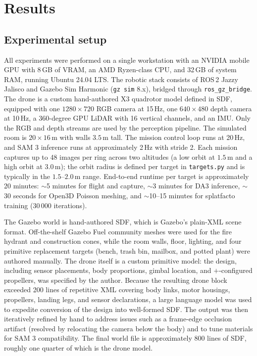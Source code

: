 \documentclass[conference]{IEEEtran}
\begin{document}
\section{Results}
\label{sec:results}

\subsection{Experimental setup}

All experiments were performed on a single workstation with an
NVIDIA mobile GPU with 8\,GB of VRAM, an AMD Ryzen-class CPU, and
32\,GB of system RAM, running Ubuntu 24.04 LTS. The robotic stack
consists of ROS\,2 Jazzy Jalisco and Gazebo Sim Harmonic
(\texttt{gz sim} 8.x), bridged through \texttt{ros\_gz\_bridge}.
The drone is a custom hand-authored X3 quadrotor model defined in
SDF, equipped with one $1280\!\times\!720$ RGB camera at 15\,Hz,
one $640\!\times\!480$ depth camera at 10\,Hz, a 360-degree GPU
LiDAR with 16 vertical channels, and an IMU. Only the RGB and depth
streams are used by the perception pipeline. The simulated room is
$20\!\times\!16$\,m with walls $3.5$\,m tall. The mission control
loop runs at 20\,Hz, and SAM 3 inference runs at approximately
2\,Hz with stride 2. Each mission captures up to 48 images per
ring across two altitudes (a low orbit at $1.5$\,m and a high
orbit at $3.0$\,m); the orbit radius is defined per target in
\texttt{targets.py} and is typically in the $1.5$--$2.0$\,m range.
End-to-end runtime per target is approximately 20 minutes:
$\sim$5 minutes for flight and capture, $\sim$3 minutes for DA3
inference, $\sim$30 seconds for Open3D Poisson meshing, and
$\sim$10--15 minutes for splatfacto training (30\,000 iterations).

The Gazebo world is hand-authored SDF, which is Gazebo's plain-XML
scene format. Off-the-shelf Gazebo Fuel community meshes were used for
the fire hydrant and construction cones, while the room walls, floor,
lighting, and four primitive replacement targets (bench, trash bin,
mailbox, and potted plant) were authored manually. The drone itself
is a custom primitive model: the design, including sensor placements,
body proportions, gimbal location, and $+$-configured propellers,
was specified by the author. Because the resulting drone block
exceeded 200 lines of repetitive XML covering body links, motor
housings, propellers, landing legs, and sensor declarations, a large
language model was used to expedite conversion of the design into
well-formed SDF. The output was then iteratively refined by hand to
address issues such as a frame-edge occlusion artifact (resolved by
relocating the camera below the body) and to tune materials for SAM 3
compatibility. The final world file is approximately 800 lines of
SDF, roughly one quarter of which is the drone model.
\end{document}
